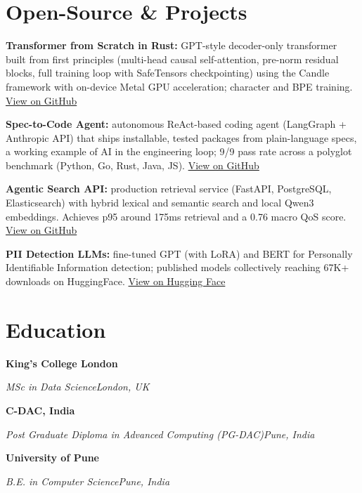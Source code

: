 \documentclass[10pt,a4paper]{article}
\newcommand{\entry}[4]{%
  {\color{company}\bfseries #1}\hfill {\color{muted}#2}\par
  \vspace{1pt}
  {\itshape #3}\hfill {\color{muted}\itshape #4}\par
  \vspace{3pt}%
}
\begin{document}
\section{Open-Source \& Projects}
\begin{tight}
  \item \textbf{Transformer from Scratch in Rust:} GPT-style decoder-only transformer built from first principles (multi-head causal self-attention, pre-norm residual blocks, full training loop with SafeTensors checkpointing) using the Candle framework with on-device Metal GPU acceleration; character and BPE training. \href{https://github.com/abhijeetscode/transformer-rust}{View on GitHub}
  \item \textbf{Spec-to-Code Agent:} autonomous ReAct-based coding agent (LangGraph + Anthropic API) that ships installable, tested packages from plain-language specs, a working example of AI in the engineering loop; 9/9 pass rate across a polyglot benchmark (Python, Go, Rust, Java, JS). \href{https://github.com/abhijeetscode/Spec-to-Code-Agent}{View on GitHub}
  \item \textbf{Agentic Search API:} production retrieval service (FastAPI, PostgreSQL, Elasticsearch) with hybrid lexical and semantic search and local Qwen3 embeddings. Achieves p95 around 175ms retrieval and a 0.76 macro QoS score. \href{https://github.com/abhijeetscode/search-agent}{View on GitHub}
  \item \textbf{PII Detection LLMs:} fine-tuned GPT (with LoRA) and BERT for Personally Identifiable Information detection; published models collectively reaching 67K+ downloads on HuggingFace. \href{https://huggingface.co/ab-ai/pii_model}{View on Hugging Face}
\end{tight}

\section{Education}
\entry{King's College London}{}{MSc in Data Science}{London, UK}
\vspace{-3pt}
\entry{C-DAC, India}{}{Post Graduate Diploma in Advanced Computing (PG-DAC)}{Pune, India}
\vspace{-3pt}
\entry{University of Pune}{}{B.E. in Computer Science}{Pune, India}
\end{document}
